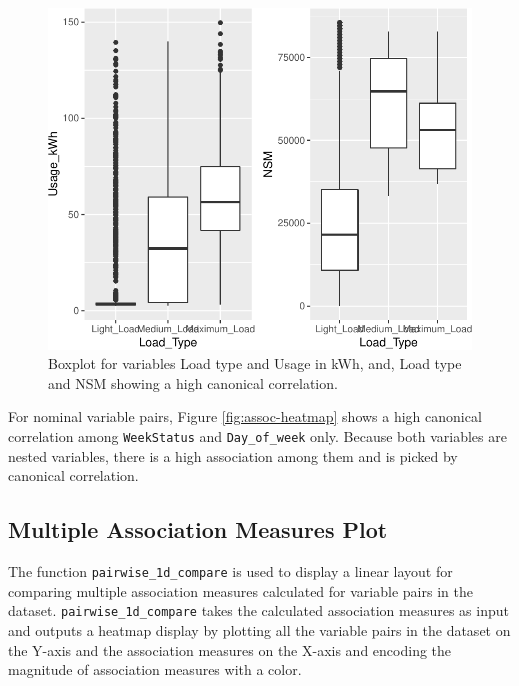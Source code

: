\begin{Schunk}
\begin{figure}

{\centering \includegraphics{rj_paper_files/figure-latex/mixed-pairs-1} 

}

\caption[Boxplot for variables Load type and Usage in kWh, and, Load type and NSM showing a high canonical correlation]{Boxplot for variables Load type and Usage in kWh, and, Load type and NSM showing a high canonical correlation. }\label{fig:mixed-pairs}
\end{figure}
\end{Schunk}

For nominal variable pairs, Figure \ref{fig:assoc-heatmap} shows a high
canonical correlation among \texttt{WeekStatus} and
\texttt{Day\_of\_week} only. Because both variables are nested
variables, there is a high association among them and is picked by
canonical correlation.

\hypertarget{multiple-association-measures-plot}{%
\subsection{Multiple Association Measures
Plot}\label{multiple-association-measures-plot}}

The function \texttt{pairwise\_1d\_compare} is used to display a linear
layout for comparing multiple association measures calculated for
variable pairs in the dataset. \texttt{pairwise\_1d\_compare} takes the
calculated association measures as input and outputs a heatmap display
by plotting all the variable pairs in the dataset on the Y-axis and the
association measures on the X-axis and encoding the magnitude of
association measures with a color.

